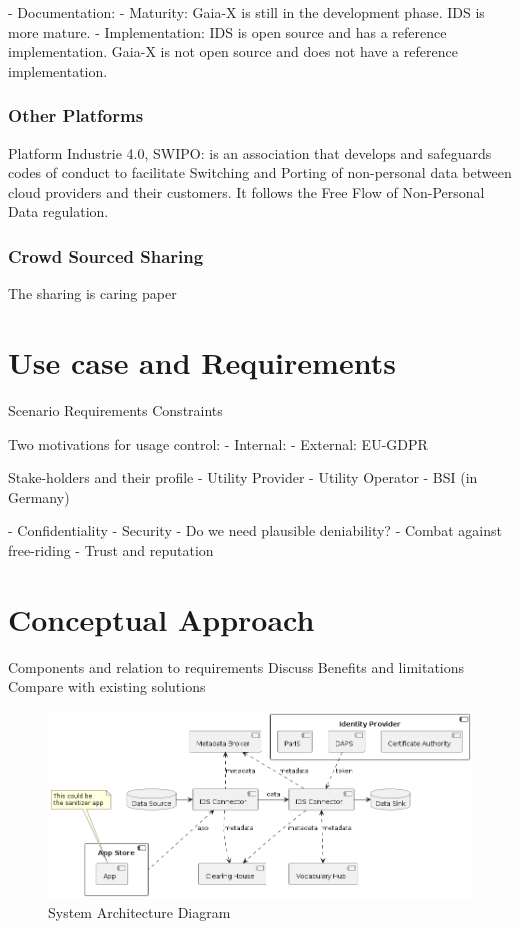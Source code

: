 \documentclass{article}
\begin{document}
- Documentation: 
- Maturity: Gaia-X is still in the development phase. IDS is more mature.
- Implementation: IDS is open source and has a reference implementation. Gaia-X is not open source and does not have a reference implementation.



\subsubsection*{Other Platforms}
Platform Industrie 4.0, 
SWIPO: is an association that develops and safeguards codes of conduct to facilitate Switching and Porting of non-personal data between cloud providers and their customers.
It follows the Free Flow of Non-Personal Data regulation.

\subsubsection*{Crowd Sourced Sharing}
The sharing is caring paper \cite{jesus_sharing_2023}


\section{Use case and Requirements} %
Scenario
Requirements
Constraints

Two motivations for usage control:
- Internal: 
- External: EU-GDPR

Stake-holders and their profile
- Utility Provider
- Utility Operator
- BSI (in Germany)

- Confidentiality
- Security
- Do we need plausible deniability?
- Combat against free-riding
- Trust and reputation


\section{Conceptual Approach} %

Components and relation to requirements
Discuss Benefits and limitations
Compare with existing solutions

\begin{figure}[h]
    \centering
    \includegraphics[width=\textwidth]{component_diagram}
    \caption{System Architecture Diagram}
    \label{fig:system-architecture}
\end{figure}
\end{document}
